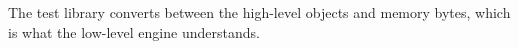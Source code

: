 The test library converts between the high-level objects and memory bytes, which is what the low-level engine understands.
\fi





